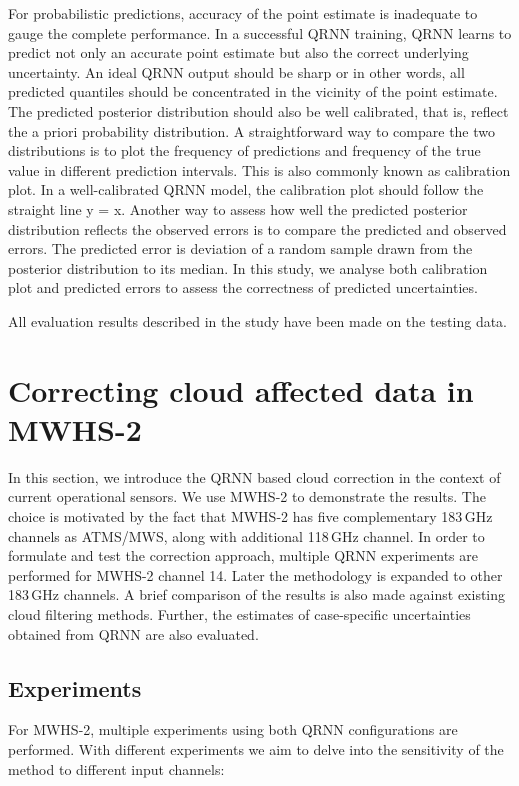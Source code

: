 \documentclass[amt, manuscript]{copernicus}
\begin{document}
For probabilistic predictions, accuracy of the point estimate is inadequate to gauge the complete performance. In a successful QRNN training, QRNN learns to predict not only an accurate point estimate but also the correct underlying uncertainty. An ideal QRNN output should be sharp or in other words, all predicted quantiles should be concentrated in the vicinity of the point estimate. The predicted posterior distribution should also be well calibrated, that is, reflect the a priori probability distribution. A straightforward way to compare the two distributions is to plot the frequency of predictions and frequency of the true value in different prediction intervals. This is also commonly known as calibration plot. In a well-calibrated QRNN model, the calibration plot should follow the straight line y = x. Another way to assess how well the predicted posterior distribution reflects the observed errors is to compare the predicted and observed errors. The predicted error is deviation of a random sample drawn from the posterior distribution to its median. In this study, we analyse both calibration plot and predicted errors to assess the correctness of predicted uncertainties.  

All evaluation results described in the study have been made on the testing data.


\section{Correcting cloud affected data in MWHS-2}
%
In this section, we introduce the QRNN based cloud  correction in the context of current operational sensors.  We use MWHS-2 to demonstrate the results. The choice is motivated by the fact that MWHS-2 has five complementary 183\,GHz channels as ATMS/MWS, along with additional 118\,GHz channel. In order to formulate and test the correction approach, multiple QRNN experiments are performed for MWHS-2 channel 14. Later the methodology is expanded to other 183\,GHz channels. A brief comparison of the results is also made against existing cloud filtering methods. Further, the estimates of case-specific uncertainties obtained from QRNN are also evaluated.

\subsection{Experiments}
%
For MWHS-2, multiple experiments using both QRNN configurations are performed. With different experiments we aim to delve into the sensitivity of the method to different input channels:
\end{document}
